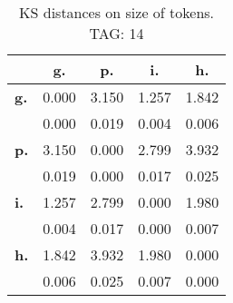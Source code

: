\begin{table}[h!]
\begin{center}
\begin{tabular}{| l || c | c | c | c |}\hline
 & {\bf g.} & {\bf p.} & {\bf i.} & {\bf h.} \\\hline\hline
{\bf g.} & 0.000 & 3.150 & 1.257 & 1.842 \\
{\bf } & 0.000 & 0.019 & 0.004 & 0.006 \\\hline
{\bf p.} & 3.150 & 0.000 & 2.799 & 3.932 \\
{\bf } & 0.019 & 0.000 & 0.017 & 0.025 \\\hline
{\bf i.} & 1.257 & 2.799 & 0.000 & 1.980 \\
{\bf } & 0.004 & 0.017 & 0.000 & 0.007 \\\hline
{\bf h.} & 1.842 & 3.932 & 1.980 & 0.000 \\
{\bf } & 0.006 & 0.025 & 0.007 & 0.000 \\\hline
\end{tabular}
\caption{KS distances on size of tokens. TAG: 14}
\end{center}
\end{table}